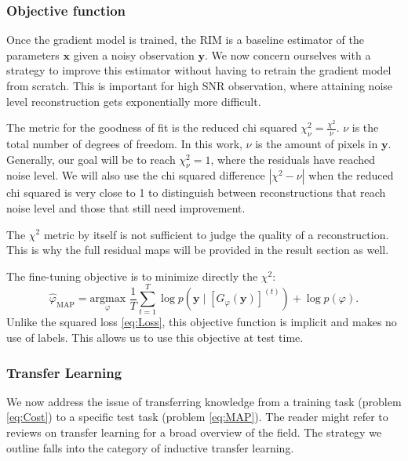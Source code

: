 \documentclass[twocolumn]{aastex631}
\begin{document}
\subsubsection{Objective function}
Once the gradient model is trained, the RIM is a baseline 
estimator of the parameters $\mathbf{x}$ given a noisy observation $\mathbf{y}$. 
We now concern ourselves with a strategy to improve 
this estimator without having to retrain the gradient model from scratch. 
This is important 
for high SNR observation, where attaining noise level reconstruction 
gets exponentially more difficult.

The metric for the goodness of fit 
is the reduced chi squared $\chi^2_\nu = \frac{\chi^2}{\nu}$.
$\nu$ is the total number of degrees of freedom. 
In this work, $\nu$ is the amount of pixels in $\mathbf{y}$.
Generally, our goal will be to reach $\chi^2_\nu = 1$, where 
the residuals have reached noise level. We will 
also use the chi squared difference $|\chi^2 - \nu|$ when 
the reduced chi squared is very close to 
1 to distinguish between reconstructions that reach noise 
level and those that still need improvement.

The $\chi^2$ metric by itself is not sufficient to judge the quality 
of a reconstruction. This is why the full residual maps 
will be provided in the result section as well. 

The fine-tuning objective is to minimize directly the $\chi^2$:
\begin{equation}\label{eq:MAP} 
        \hat{\varphi}_{\mathrm{MAP}} = \underset{\varphi}{\mathrm{argmax}}\,\, 
        \frac{1}{T}\sum_{t=1}^{T} \log p(\mathbf{y} \mid [G_\varphi(\mathbf{y})]^{(t)}) + \log p(\varphi).
\end{equation} 
Unlike the squared loss \eqref{eq:Loss}, this objective function is implicit 
and makes no use of labels. 
This allows us to use this objective at test time. 

\subsubsection{Transfer Learning}
We now address the issue of transferring knowledge from a training task 
(problem \eqref{eq:Cost}) to a specific test task (problem \eqref{eq:MAP}).
The reader might refer to reviews on transfer learning \citep{Pan2010,Zhuang2019} 
for a broad overview of the field. The strategy we outline falls into 
the category of inductive transfer learning.
\end{document}
